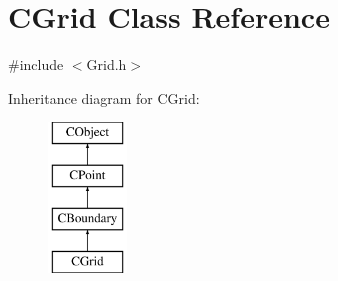 \hypertarget{classCGrid}{}\section{C\+Grid Class Reference}
\label{classCGrid}


{\ttfamily \#include $<$Grid.\+h$>$}

Inheritance diagram for C\+Grid\+:\begin{figure}[H]
\begin{center}
\leavevmode
\includegraphics[height=4.000000cm]{classCGrid}
\end{center}
\end{figure}
